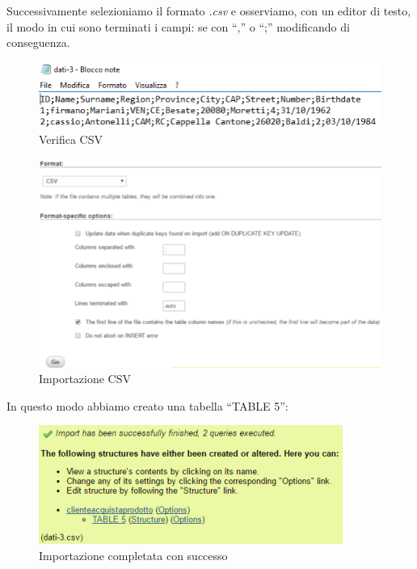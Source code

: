 Successivamente selezioniamo il formato \textit{.csv} e osserviamo, con un editor di testo, il modo in cui sono terminati i campi: se con “,” o “;” modificando  di conseguenza. 

\begin{center}
\begin{figure}[H]
\centering
\includegraphics[scale=1]{figures/verifica_csv.png}
\caption{Verifica CSV} 
\end{figure}
\end{center}  

\begin{center}
\begin{figure}[H]
\centering
\includegraphics[scale=1]{figures/import_csv.png}
\caption{Importazione CSV} 
\end{figure}
\end{center} 

In questo modo abbiamo creato una tabella “TABLE 5”:

\begin{center}
\begin{figure}[H]
\centering
\includegraphics[scale=1]{figures/import_completed.png}
\caption{Importazione completata con successo} 
\end{figure}
\end{center} 

